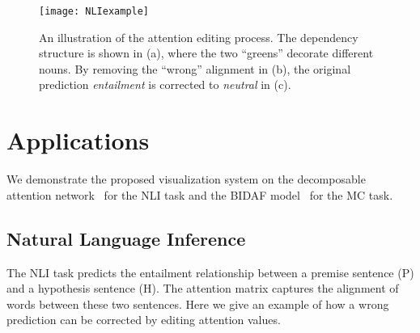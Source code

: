 \begin{figure*}[t]
\centering
 \texttt{[image: NLIexample]}
  \vspace{-6mm}
 \caption{
An illustration of the attention editing process.
The dependency structure is shown in (a), where the two ``greens'' decorate different nouns.
By removing the ``wrong'' alignment in (b), the original prediction \emph{entailment} is corrected to \emph{neutral} in (c).
}
\label{fig:NLIexample}
\end{figure*}

\section{Applications}
We demonstrate the proposed visualization system on the decomposable attention network~\cite{parikh2016emnlp}
for the NLI task and the BIDAF model~\cite{Seo2016} for the MC task.

\subsection{Natural Language Inference}
\label{sec:NLIexample}
The NLI task predicts the entailment relationship between a premise sentence (P) and a hypothesis sentence (H).
The attention matrix captures the alignment of words between these two sentences.
Here we give an example of how a wrong prediction can be corrected by editing attention values.  


